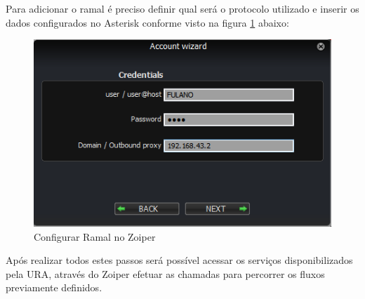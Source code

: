Para adicionar o ramal é preciso definir qual será o protocolo utilizado e inserir os dados configurados no Asterisk conforme visto na figura \ref{figura:zoiperConfigRamal} abaixo:

\begin{figure}[!htb]
	\centering
	\caption{Configurar Ramal no Zoiper}
	\label{figura:zoiperConfigRamal}
	\includegraphics{figuras/configurar_ramal_zoiper.png}
\end{figure}

Após realizar todos estes passos será possível acessar os serviços disponibilizados pela URA, através do Zoiper efetuar as chamadas para percorrer os fluxos previamente definidos.